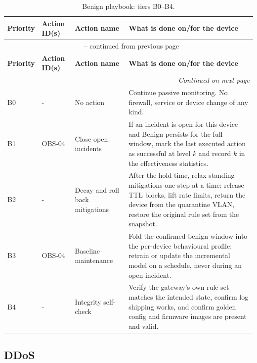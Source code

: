 \begin{longtable}{|p{}|p{}|p{}|p{}|}
\caption{Benign playbook: tiers B0--B4.}
\label{tab:playbook_benign}\\
\hline
\textbf{Priority} & \textbf{Action ID(s)} & \textbf{Action name} & \textbf{What is done on/for the device} \\
\hline
\endfirsthead
\multicolumn{4}{c}{\tablename\ \thetable{} -- continued from previous page}\\
\hline
\textbf{Priority} & \textbf{Action ID(s)} & \textbf{Action name} & \textbf{What is done on/for the device} \\
\hline
\endhead
\hline \multicolumn{4}{r}{\textit{Continued on next page}}\\
\endfoot
\hline
\endlastfoot
B0 & - & No action & Continue passive monitoring. No firewall, service or device change of any kind. \\
\hline
B1 & OBS-04 & Close open incidents & If an incident is open for this device and Benign persists for the full window, mark the last executed action as successful at level $k$ and record $k$ in the effectiveness statistics. \\
\hline
B2 & - & Decay and roll back mitigations & After the hold time, relax standing mitigations one step at a time: release TTL blocks, lift rate limits, return the device from the quarantine VLAN, restore the original rule set from the snapshot. \\
\hline
B3 & OBS-04 & Baseline maintenance & Fold the confirmed-benign window into the per-device behavioural profile; retrain or update the incremental model on a schedule, never during an open incident. \\
\hline
B4 & - & Integrity self-check & Verify the gateway's own rule set matches the intended state, confirm log shipping works, and confirm golden config and firmware images are present and valid. \\
\hline
\end{longtable}

\newpage \subsection{DDoS}

